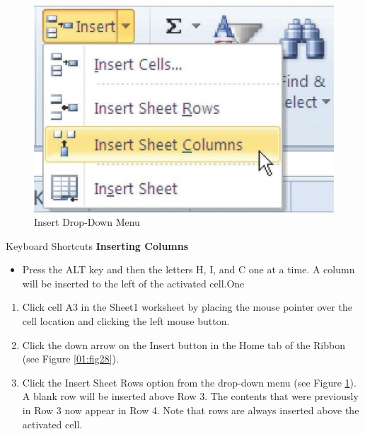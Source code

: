 \begin{figure}[H]
	\centering
	\includegraphics[width=\maxwidth{.95\linewidth}]{gfx/ch01_fig29}
	\caption{Insert Drop-Down Menu}
	\label{01:fig29}
\end{figure}

\begin{center}
	\begin{shtcutbox}{Keyboard Shortcuts}
		\textbf{Inserting Columns}
		\\
		\begin{itemize}
			\setlength{\itemsep}{0pt}
			\setlength{\parskip}{0pt}
			\setlength{\parsep}{0pt}
			
			\item Press the ALT key and then the letters H, I, and C one at a time. A column will be inserted to the left of the activated cell.One
			
		\end{itemize}
	\end{shtcutbox}
\end{center}

\begin{enumerate}[resume]
	\item Click cell \textsf{A3} in the Sheet1 worksheet by placing the mouse pointer over the cell location and clicking the left mouse button.
	\item Click the down arrow on the Insert button in the Home tab of the Ribbon (see Figure \ref{01:fig28}).
	\item Click the Insert Sheet Rows option from the drop-down menu (see Figure \ref{01:fig29}). A blank row will be inserted above Row 3. The contents that were previously in Row 3 now appear in Row 4. Note that rows are always inserted above the activated cell.
\end{enumerate}

